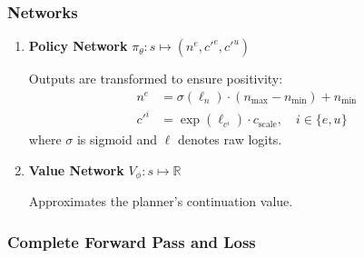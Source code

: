 \subsubsection{Networks}
\begin{enumerate}
    \item \textbf{Policy Network} $\pi_\theta: s \mapsto (n^e, c'^e, c'^u)$
    
    Outputs are transformed to ensure positivity:
    \begin{align}
        n^e &= \sigma(\ell_n) \cdot (n_{\max} - n_{\min}) + n_{\min} \\
        c'^i &= \exp(\ell_{c^i}) \cdot c_{\text{scale}}, \quad i \in \{e, u\}
    \end{align}
    where $\sigma$ is sigmoid and $\ell$ denotes raw logits.
    
    \item \textbf{Value Network} $V_\phi: s \mapsto \mathbb{R}$
    
    Approximates the planner's continuation value.
\end{enumerate}

\subsubsection{Complete Forward Pass and Loss}

